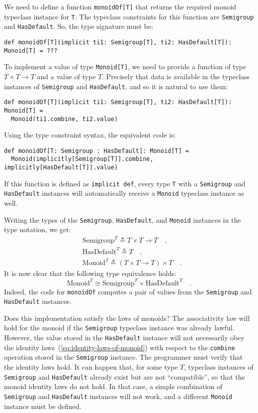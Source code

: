 We need to define a function \lstinline!monoidOf[T]! that returns
the required monoid typeclass instance for \lstinline!T!. The typeclass
constraints for this function are \lstinline!Semigroup! and \lstinline!HasDefault!.
So, the type signature must be:
\begin{lstlisting}
def monoidOf[T](implicit ti1: Semigroup[T], ti2: HasDefault[T]): Monoid[T] = ???
\end{lstlisting}
To implement a value of type \lstinline!Monoid[T]!, we need to provide
a function of type $T\times T\rightarrow T$ and a value of type $T$.
Precisely that data is available in the typeclass instances of \lstinline!Semigroup!
and \lstinline!HasDefault!, and so it is natural to use them:
\begin{lstlisting}
def monoidOf[T](implicit ti1: Semigroup[T], ti2: HasDefault[T]): Monoid[T] =
  Monoid(ti1.combine, ti2.value)
\end{lstlisting}
Using the type constraint syntax, the equivalent code is:
\begin{lstlisting}
def monoidOf[T: Semigroup : HasDefault]: Monoid[T] =
  Monoid(implicitly[Semigroup[T]].combine, implicitly[HasDefault[T]].value)
\end{lstlisting}
If this function is defined as \lstinline!implicit def!, every type
\lstinline!T! with a \lstinline!Semigroup! and \lstinline!HasDefault!
instances will automatically receive a \lstinline!Monoid! typeclass
instance as well.

Writing the types of the \lstinline!Semigroup!, \lstinline!HasDefault!,
and \lstinline!Monoid! instances in the type notation, we get:
\begin{align*}
 & \text{Semigroup}^{T}\triangleq T\times T\rightarrow T\quad,\\
 & \text{HasDefault}^{T}\triangleq T\quad,\\
 & \text{Monoid}^{T}\triangleq\left(T\times T\rightarrow T\right)\times T\quad.
\end{align*}
It is now clear that the following type equivalence holds:
\[
\text{Monoid}^{T}\cong\text{Semigroup}^{T}\times\text{HasDefault}^{T}\quad.
\]
Indeed, the code for \lstinline!monoidOf! computes a pair of values
from the \lstinline!Semigroup! and \lstinline!HasDefault! instances. 

Does this implementation satisfy the laws of monoids? The associativity
law will hold for the monoid
if the \lstinline!Semigroup! typeclass instance was already lawful.
However, the value stored in the \lstinline!HasDefault! instance
will not necessarily obey the identity laws~(\ref{eq:identity-laws-of-monoid})
with respect to the \lstinline!combine! operation stored in the \lstinline!Semigroup!
instance. The programmer must verify that the identity laws hold.
It can happen that, for some type $T$, typeclass instances of \lstinline!Semigroup!
and \lstinline!HasDefault! already exist but are not \textsf{``}compatible\textsf{''},
so that the monoid identity laws do not hold. In that case, a simple
combination of \lstinline!Semigroup! and \lstinline!HasDefault!
instances will not work, and a different \lstinline!Monoid! instance
must be defined.

